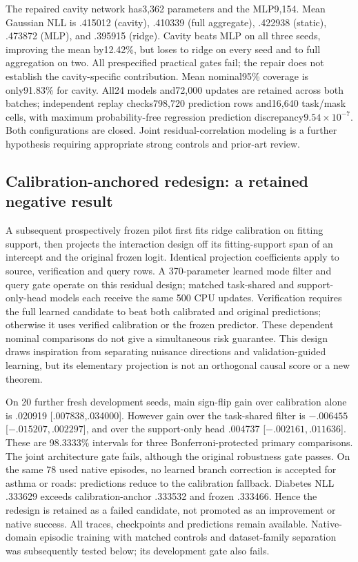\documentclass[10pt]{article}
\begin{document}
The repaired cavity network has3,362 parameters and the MLP9,154. Mean Gaussian NLL is .415012 (cavity), .410339 (full aggregate), .422938 (static), .473872 (MLP), and .395915 (ridge). Cavity beats MLP on all three seeds, improving the mean by12.42\%, but loses to ridge on every seed and to full aggregation on two. All prespecified practical gates fail; the repair does not establish the cavity-specific contribution. Mean nominal95\% coverage is only91.83\% for cavity. All24 models and72,000 updates are retained across both batches; independent replay checks798,720 prediction rows and16,640 task/mask cells, with maximum probability-free regression prediction discrepancy$9.54\times10^{-7}$. Both configurations are closed. Joint residual-correlation modeling is a further hypothesis requiring appropriate strong controls and prior-art review.

\subsection{Calibration-anchored redesign: a retained negative result}
A subsequent prospectively frozen pilot first fits ridge calibration on fitting support, then projects the interaction design off its fitting-support span of an intercept and the original frozen logit. Identical projection coefficients apply to source, verification and query rows. A 370-parameter learned mode filter and query gate operate on this residual design; matched task-shared and support-only-head models each receive the same 500 CPU updates. Verification requires the full learned candidate to beat both calibrated and original predictions; otherwise it uses verified calibration or the frozen predictor. These dependent nominal comparisons do not give a simultaneous risk guarantee. This design draws inspiration from separating nuisance directions\cite{chernozhukov2018} and validation-guided learning\cite{ren2018}, but its elementary projection is not an orthogonal causal score or a new theorem.

On 20 further fresh development seeds, main sign-flip gain over calibration alone is .020919 [.007838,.034000]. However gain over the task-shared filter is $-.006455$ [$-.015207,.002297$], and over the support-only head .004737 [$-.002161,.011636$]. These are 98.3333\% intervals for three Bonferroni-protected primary comparisons. The joint architecture gate fails, although the original robustness gate passes. On the same 78 used native episodes, no learned branch correction is accepted for asthma or roads: predictions reduce to the calibration fallback. Diabetes NLL .333629 exceeds calibration-anchor .333532 and frozen .333466. Hence the redesign is retained as a failed candidate, not promoted as an improvement or native success. All traces, checkpoints and predictions remain available. Native-domain episodic training with matched controls and dataset-family separation was subsequently tested below; its development gate also fails.
\end{document}
